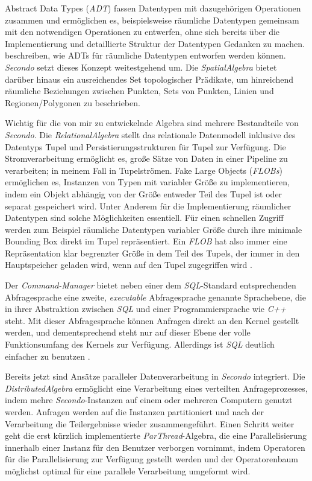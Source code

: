\documentclass[a4paper,12pt,twoside]{article}
\newcommand{\Fb}[1]{\textit{#1}} %
\begin{document}
Abstract Data Types (\Fb{ADT}) fassen Datentypen mit dazugehörigen Operationen zusammen und ermöglichen es, beispielsweise räumliche Datentypen gemeinsam mit den notwendigen Operationen zu entwerfen, ohne sich bereits über die Implementierung und detaillierte Struktur der Datentypen Gedanken zu machen. {\textcite[S. 75ff]{Rigaux2001}} beschreiben, wie ADTs für räumliche Datentypen entworfen werden können. \Fb{Secondo} setzt dieses Konzept weitestgehend um. Die \Fb{SpatialAlgebra} bietet darüber hinaus ein ausreichendes Set topologischer Prädikate, um hinreichend räumliche Beziehungen zwischen Punkten, Sets von Punkten, Linien und Regionen/Polygonen zu beschrieben.

Wichtig für die von mir zu entwickelnde Algebra sind mehrere Bestandteile von \Fb{Secondo}. Die \Fb{RelationalAlgebra} stellt das relationale Datenmodell inklusive des Datentyps Tupel und Persistierungsstrukturen für Tupel zur Verfügung. Die Stromverarbeitung ermöglicht es, große Sätze von Daten in einer Pipeline zu verarbeiten; in meinem Fall in Tupelströmen. Fake Large Objects (\Fb{FLOBs}) ermöglichen es, Instanzen von Typen mit variabler Größe zu implementieren, indem ein Objekt abhängig von der Größe entweder Teil des Tupel ist oder separat gespeichert wird. Unter Anderem für die Implementierung räumlicher Datentypen sind solche Möglichkeiten essentiell. Für einen schnellen Zugriff werden zum Beispiel räumliche Datentypen variabler Größe durch ihre minimale Bounding Box direkt im Tupel repräsentiert. Ein \Fb{FLOB} hat also immer eine Repräsentation klar begrenzter Größe in dem Teil des Tupels, der immer in den Hauptspeicher geladen wird, wenn auf den Tupel zugegriffen wird \parencite{Gueting2010}.

Der \Fb{Command-Manager} bietet neben einer dem \Fb{SQL}-Standard entsprechenden Abfragesprache eine zweite, \Fb{executable} Abfragesprache genannte Sprachebene, die in ihrer Abstraktion zwischen \Fb{SQL} und einer Programmiersprache wie \Fb{C++} steht. Mit dieser Abfragesprache können Anfragen direkt an den Kernel gestellt werden, und dementsprechend steht nur auf dieser Ebene der volle Funktionsumfang des Kernels zur Verfügung. Allerdings ist \Fb{SQL} deutlich einfacher zu benutzen \parencite{Gueting2010}. 

Bereits jetzt sind Ansätze paralleler Datenverarbeitung in \Fb{Secondo} integriert. Die \Fb{DistributedAlgebra} \parencite{Nidzwetzki2017} ermöglicht eine Verarbeitung eines verteilten Anfrageprozesses, indem mehre \Fb{Secondo}-Instanzen auf einem oder mehreren Computern genutzt werden. Anfragen werden auf die Instanzen partitioniert und nach der Verarbeitung die Teilergebnisse wieder zusammengeführt. Einen Schritt weiter geht die erst kürzlich implementierte \Fb{ParThread}-Algebra, die eine Parallelisierung innerhalb einer Instanz für den Benutzer verborgen vornimmt, indem Operatoren für die Parallelisierung zur Verfügung gestellt werden und der Operatorenbaum möglichst optimal für eine parallele Verarbeitung umgeformt wird.
\end{document}

